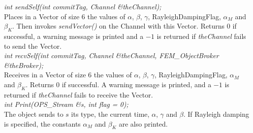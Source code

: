 {\em int sendSelf(int commitTag, Channel \&theChannel); } \\ 
Places in a Vector of size 6 the values of $\alpha$, $\beta$, $\gamma$, 
RayleighDampingFlag, $\alpha_M$ and $\beta_K$.  Then
invokes {\em sendVector()} on the Channel with this Vector. Returns
$0$ if successful, a warning message is printed and a $-1$ is
returned if {\em theChannel} fails to send the Vector. \\ 

{\em int recvSelf(int commitTag, Channel \&theChannel, 
FEM\_ObjectBroker \&theBroker); } \\ 
Receives in a Vector of size 6 the values of $\alpha$, $\beta$, $\gamma$, 
RayleighDampingFlag, $\alpha_M$ and $\beta_K$. Returns $0$
if successful. A warning message is printed, and a $-1$ is returned if
{\em theChannel} fails to receive the Vector.\\

{\em int Print(OPS_Stream \&s, int flag = 0);}\\
The object sends to $s$ its type, the current time, $\alpha$, $\gamma$ and
$\beta$. If Rayleigh damping is specified, the constants $\alpha_M$ and
$\beta_K$ are also printed.


